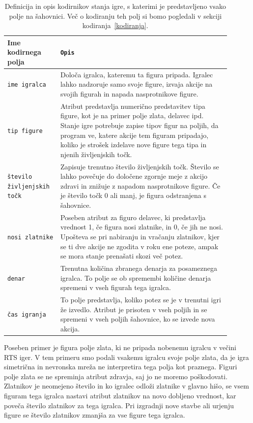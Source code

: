 \documentclass[a4paper, 12pt]{book}
\begin{document}
{\begin{table}
	\begin{center}
		\begin{tabular}{p{0.2\linewidth}|p{0.7\linewidth}}
			Ime kodirnega polja                      & {\tt Opis} \\ \hline
			{\tt ime igralca}                        & Določa igralca, kateremu ta figura pripada. 
			 										   Igralec lahko nadzoruje samo svoje figure, izvaja akcije na svojih figurah in napada nasprotnikove figure. \\
			{\tt tip figure}                         & Atribut predstavlja numerično predstavitev tipa figure, kot je na primer polje zlata, delavec ipd.
													   Stanje igre potrebuje zapise tipov figur na poljih, da program ve, katere akcije tem figuram pripadajo, koliko je strošek izdelave nove figure tega tipa in njenih življenjskih točk.\\
			{\tt število življenjskih točk}          & Zapisuje trenutno število življenjskih točk.
													   Število se lahko povečuje do določene zgornje meje z akcijo zdravi in znižuje z napadom nasprotnikove figure. Če je število točk 0 ali manj, je figura odstranjena s šahovnice. \\
			{\tt nosi zlatnike}                      & Poseben atribut za figuro delavec, ki predstavlja vrednost 1, če figura nosi zlatnike, in 0, če jih ne nosi.
													   Upošteva se pri nabiranju in vračanju zlatnikov, kjer se ti dve akcije ne zgodita v roku ene poteze, ampak se mora stanje prenašati skozi več potez. \\
			{\tt denar}                              & Trenutna količina zbranega denarja za posameznega igralca.
													   To polje se ob spremembi količine denarja spremeni v vseh figurah tega igralca. \\
			{\tt čas igranja}                        & To polje predstavlja, koliko potez se je v trenutni igri že izvedlo.
													   Atribut je prisoten v vseh poljih in se spremeni v vseh poljih šahovnice, ko se izvede nova akcija. \\
		\end{tabular}
	\end{center}
	\caption{Definicija in opis kodirnikov stanja igre, s katerimi je predstavljeno vsako polje na šahovnici. Več o kodiranju teh polj si bomo pogledali v sekciji kodiranja~\ref{kodiranja}.}
	\label{tableEncoders}
\end{table}

Poseben primer je figura polje zlata, ki ne pripada nobenemu igralcu v večini RTS iger. 
V tem primeru smo podali vsakemu igralcu svoje polje zlata, da je igra simetrična in nevronska mreža ne interpretira tega polja kot praznega.
Figuri polje zlata se ne spreminja atribut zdravja, saj jo ne moremo poškodovati. 
Zlatnikov je neomejeno število in ko igralec odloži zlatnike v glavno hišo, se vsem figuram tega igralca nastavi atribut zlatnikov na novo dobljeno vrednost, kar poveča število zlatnikov za tega igralca. 
Pri izgradnji nove stavbe ali urjenju figure se število zlatnikov zmanjša za vse figure tega igralca.

}
\end{document}
